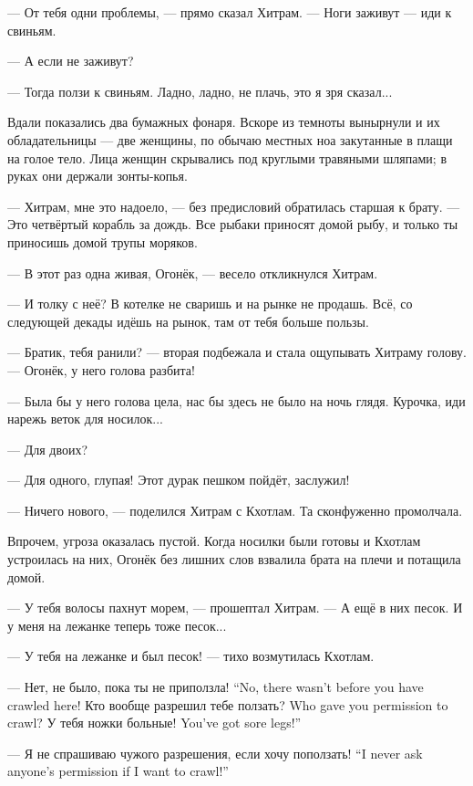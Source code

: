 --- От тебя одни проблемы, --- прямо сказал Хитрам.
--- Ноги заживут --- иди к свиньям.

--- А если не заживут?

--- Тогда ползи к свиньям.
Ладно, ладно, не плачь, это я зря сказал...

Вдали показались два бумажных фонаря.
Вскоре из темноты вынырнули и их обладательницы --- две женщины, по обычаю местных ноа закутанные в плащи на голое тело.
Лица женщин скрывались под круглыми травяными шляпами;
в руках они держали зонты-копья.

--- Хитрам, мне это надоело, --- без предисловий обратилась старшая к брату.
--- Это четвёртый корабль за дождь.
Все рыбаки приносят домой рыбу, и только ты приносишь домой трупы моряков.

--- В этот раз одна живая, Огонёк, --- весело откликнулся Хитрам.

--- И толку с неё?
В котелке не сваришь и на рынке не продашь.
Всё, со следующей декады идёшь на рынок, там от тебя больше пользы.

--- Братик, тебя ранили? --- вторая подбежала и стала ощупывать Хитраму голову.
--- Огонёк, у него голова разбита!

--- Была бы у него голова цела, нас бы здесь не было на ночь глядя.
Курочка, иди нарежь веток для носилок...

--- Для двоих?

--- Для одного, глупая!
Этот дурак пешком пойдёт, заслужил!

--- Ничего нового, --- поделился Хитрам с Кхотлам.
Та сконфуженно промолчала.

Впрочем, угроза оказалась пустой.
Когда носилки были готовы и Кхотлам устроилась на них, Огонёк без лишних слов взвалила брата на плечи и потащила домой.

\asterism

--- У тебя волосы пахнут морем, --- прошептал Хитрам.
--- А ещё в них песок.
И у меня на лежанке теперь тоже песок...

--- У тебя на лежанке и был песок! --- тихо возмутилась Кхотлам.

{--- Нет, не было, пока ты не приползла!}
{``No, there wasn't before you have crawled here!}
{Кто вообще разрешил тебе ползать?}
{Who gave you permission to crawl?}
{У тебя ножки больные!}
{You've got sore legs!''}

{--- Я не спрашиваю чужого разрешения, если хочу поползать!}
{``I never ask anyone's permission if I want to crawl!''}

